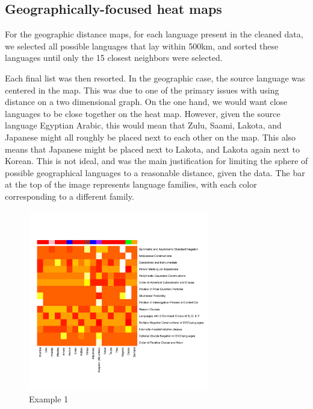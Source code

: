 \documentclass[11pt]{article}
\begin{document}
\subsection{Geographically-focused heat maps}
For the geographic distance maps, for each language present in the cleaned data, we selected all possible languages that lay within 500km, and sorted these languages until only the 15 closest neighbors were selected. 

Each final list was then resorted. In the geographic case, the source language was centered in the map. This was due to one of the primary issues with using distance on a two dimensional graph. On the one hand, we would want close languages to be close together on the heat map. However, given the source language Egyptian Arabic, this would mean that Zulu, Saami, Lakota, and Japanese might all roughly be placed next to each other on the map. This also means that Japanese might be placed next to Lakota, and Lakota again next to Korean. This is not ideal, and was the main justification for limiting the sphere of possible geographical languages to a reasonable distance, given the data. The bar at the top of the image represents language families, with each color corresponding to a different family.


\begin{figure}[h]
\includegraphics[width=3.1in]
{graph2yimassmall.pdf} 
\caption{Example 1} 
\label{fig:heat1} 
\end{figure}
\end{document}
